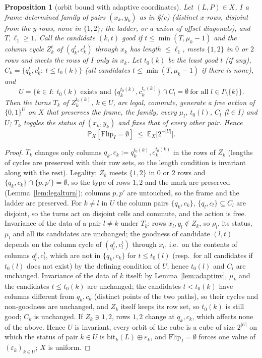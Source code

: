 \documentclass[11pt]{article}
\newtheorem{proposition}[theorem]{Proposition}
\theoremstyle{definition}
\newcommand{\E}{\mathbb{E}}
\renewcommand{\Pr}{\mathbb{P}}
\begin{document}
\begin{proposition}[orbit bound with adaptive coordinates]\label{prop:adaptive}
Let $(L,P)\in X$, $I$ a frame-determined family of pairs $(x_k,y_k)$
as in \S(c) (distinct $x$-rows, disjoint from the $y$-rows, none in
$\{1,2\}$; the ladder, or a union of offset diagonals), and
$T,\ell_1\ge1$.  Call the candidate $(k,t)$ \emph{good} if
$t\le\min(T,\mu_k-1)$ and the column cycle $Z_k^t$ of $(q_k^t,c_k^t)$
through $x_k$ has length $\le\ell_1$, meets $\{1,2\}$ in $0$ or $2$
rows and meets the rows of $I$ only in $x_k$.  Let $t_0(k)$ be
the least good $t$ (if any), $C_k=\{q_k^t,c_k^t:\ t\le t_0(k)\}$
(all candidates $t\le\min(T,\mu_k-1)$ if there is none), and
\[
U=\bigl\{k\in I:\ t_0(k)\text{ exists and }\{q_k^{t_0(k)},c_k^{t_0(k)}\}\cap C_l=\emptyset\ \text{for all }l\in I\setminus\{k\}\bigr\}.
\]
Then the turns $T_k$ of $Z_k^{t_0(k)}$, $k\in U$, are legal, commute,
generate a free action of $\{0,1\}^U$ on $X$ that preserves the frame,
the family, every $\mu_l$, $t_0(l)$, $C_l$ ($l\in I$) and $U$; $T_k$
toggles the status of $(x_k,y_k)$ and fixes that of every other pair.
Hence
\[
\Pr_X[\mathrm{Flip}_I=\emptyset]\;\le\;\E_X\bigl[2^{-|U|}\bigr].
\]
\end{proposition}
\begin{proof}
$T_k$ changes only columns $q_k,c_k:=q_k^{t_0(k)},c_k^{t_0(k)}$ in the
rows of $Z_k$ (lengths of cycles are preserved with their row sets, so
the length condition is invariant along with the rest).  Legality: $Z_k$ meets $\{1,2\}$ in $0$ or $2$ rows and
$\{q_k,c_k\}\cap\{p,p'\}=\emptyset$, so the type of rows $1,2$ and the
mark are preserved (Lemma~\ref{lem:legalturn}); columns $p,p'$ are
untouched, so the frame and the ladder are preserved.  For $k\ne l$ in
$U$ the column pairs $\{q_k,c_k\}$, $\{q_l,c_l\}\subseteq C_l$ are
disjoint, so the turns act on disjoint cells and commute, and the
action is free.  Invariance of the data of a pair $l\ne k$ under $T_k$:
rows $x_l,y_l\notin Z_k$, so $\rho_l$, its status, $\mu_l$ and all its
candidates are unchanged; the goodness of candidate $(l,t)$ depends on
the column cycle of $(q_l^t,c_l^t)$ through $x_l$, i.e.\ on the
contents of columns $q_l^t,c_l^t$, which are not in $\{q_k,c_k\}$ for
$t\le t_0(l)$ (resp.\ for all candidates if $t_0(l)$ does not exist) by
the defining condition of $U$; hence $t_0(l)$ and $C_l$ are unchanged.
Invariance of the data of $k$ itself: by Lemma~\ref{lem:adaptinv},
$\mu_k$ and the candidates $t\le t_0(k)$ are unchanged; the candidates
$t<t_0(k)$ have columns different from $q_k,c_k$ (distinct points of
the two paths), so their cycles and non-goodness are unchanged, and
$Z_k$ itself keeps its row set, so $t_0(k)$ is still good; $C_k$ is
unchanged.  If $Z_k\ni1,2$, rows $1,2$ change at $q_k,c_k$, which
affects none of the above.  Hence $U$ is invariant, every orbit of the
cube is a cube of size $2^{|U|}$ on which the status of pair $k\in U$
is $\mathrm{bit}_k(L)\oplus\varepsilon_k$, and $\mathrm{Flip}_I=\emptyset$
forces one value of $(\varepsilon_k)_{k\in U}$; $X$ is uniform.
\end{proof}
\end{document}
